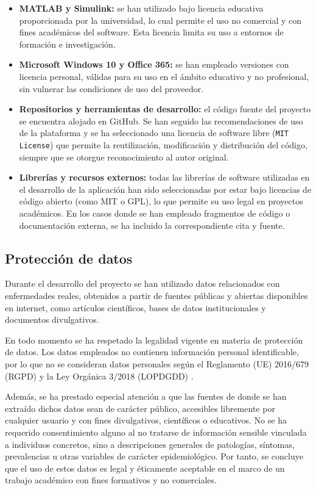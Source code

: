 \begin{itemize}
    \item \textbf{MATLAB y Simulink:} se han utilizado bajo licencia educativa proporcionada por la universidad, lo cual permite el uso no comercial y con fines académicos del software. Esta licencia limita su uso a entornos de formación e investigación.
    \item \textbf{Microsoft Windows 10 y Office 365:} se han empleado versiones con licencia personal, válidas para su uso en el ámbito educativo y no profesional, sin vulnerar las condiciones de uso del proveedor.
    \item \textbf{Repositorios y herramientas de desarrollo:} el código fuente del proyecto se encuentra alojado en GitHub. Se han seguido las recomendaciones de uso de la plataforma y se ha seleccionado una licencia de software libre (\texttt{MIT License}) que permite la reutilización, modificación y distribución del código, siempre que se otorgue reconocimiento al autor original.
    \item \textbf{Librerías y recursos externos:} todas las librerías de software utilizadas en el desarrollo de la aplicación han sido seleccionadas por estar bajo licencias de código abierto (como MIT o GPL), lo que permite su uso legal en proyectos académicos. En los casos donde se han empleado fragmentos de código o documentación externa, se ha incluido la correspondiente cita y fuente.
\end{itemize}

\subsection{Protección de datos}

Durante el desarrollo del proyecto se han utilizado datos relacionados con enfermedades reales, obtenidos a partir de fuentes públicas y abiertas disponibles en internet, como artículos científicos, bases de datos institucionales y documentos divulgativos. 

En todo momento se ha respetado la legalidad vigente en materia de protección de datos. Los datos empleados no contienen información personal identificable, por lo que no se consideran datos personales según el Reglamento (UE) 2016/679 (RGPD) \cite{ue2016rgpd} y la Ley Orgánica 3/2018 (LOPDGDD) \cite{lopdgdd2018}.

Además, se ha prestado especial atención a que las fuentes de donde se han extraído dichos datos sean de carácter público, accesibles libremente por cualquier usuario y con fines divulgativos, científicos o educativos. No se ha requerido consentimiento alguno al no tratarse de información sensible vinculada a individuos concretos, sino a descripciones generales de patologías, síntomas, prevalencias u otras variables de carácter epidemiológico.
Por tanto, se concluye que el uso de estos datos es legal y éticamente aceptable en el marco de un trabajo académico con fines formativos y no comerciales.

